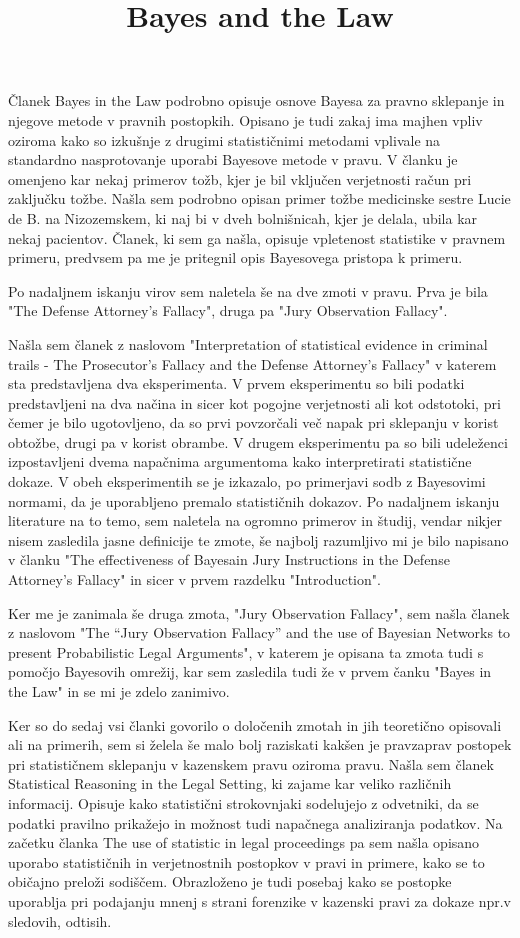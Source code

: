 \documentclass[a4paper,12pt]{article}
\begin{document}
\title{Bayes and the Law}
Članek Bayes in the Law podrobno opisuje osnove Bayesa za pravno sklepanje in njegove metode v pravnih postopkih. 
Opisano je tudi zakaj ima majhen vpliv oziroma kako so izkušnje z drugimi statističnimi metodami vplivale na standardno 
nasprotovanje uporabi Bayesove metode v pravu. V članku je omenjeno kar nekaj primerov tožb, kjer je bil vključen verjetnosti račun 
pri zaključku tožbe. Našla sem podrobno opisan primer tožbe medicinske sestre Lucie de B. na Nizozemskem, ki naj bi v dveh bolnišnicah, 
kjer je delala, ubila kar nekaj pacientov. Članek, ki sem ga našla, opisuje vpletenost statistike v pravnem primeru, predvsem pa me je pritegnil
opis Bayesovega pristopa k primeru.

Po nadaljnem iskanju virov sem naletela še na dve zmoti v pravu. Prva je bila "The Defense Attorney's Fallacy", druga pa "Jury Observation Fallacy". 

Našla sem članek z naslovom "Interpretation of statistical evidence in criminal trails - The Prosecutor's Fallacy and the Defense Attorney's Fallacy" v 
katerem sta predstavljena dva eksperimenta. V prvem eksperimentu so bili podatki predstavljeni na dva načina in sicer kot pogojne verjetnosti ali kot odstotoki, 
pri čemer je bilo ugotovljeno, da so prvi povzorčali več napak pri sklepanju v korist obtožbe, drugi pa v korist obrambe. V drugem eksperimentu pa so bili udeleženci 
izpostavljeni dvema napačnima argumentoma kako interpretirati statistične dokaze. V obeh eksperimentih se je izkazalo, po primerjavi sodb z Bayesovimi normami, da je 
uporabljeno premalo statističnih dokazov.
Po nadaljnem iskanju literature na to temo, sem naletela na ogromno primerov in študij, vendar nikjer nisem zasledila jasne definicije te zmote, še najbolj razumljivo mi je 
bilo napisano v članku "The effectiveness of Bayesain Jury Instructions in the Defense Attorney's Fallacy" in sicer v prvem razdelku "Introduction". 

Ker me je zanimala še druga zmota, "Jury Observation Fallacy", sem našla članek z naslovom "The “Jury Observation Fallacy” and the use of Bayesian Networks to present 
Probabilistic Legal Arguments", v katerem je opisana ta zmota tudi s pomočjo Bayesovih omrežij, kar sem zasledila tudi že v prvem čanku "Bayes in the Law" 
in se mi je zdelo zanimivo.

Ker so do sedaj vsi članki govorilo o določenih zmotah in jih teoretično opisovali ali na primerih, sem si želela še malo bolj raziskati kakšen je pravzaprav 
postopek pri statističnem sklepanju v kazenskem pravu oziroma pravu. Našla sem članek Statistical Reasoning in the Legal Setting, ki zajame kar veliko 
različnih informacij. Opisuje kako statistični strokovnjaki sodelujejo z odvetniki, da se podatki pravilno prikažejo in možnost tudi napačnega analiziranja podatkov.
Na začetku članka The use of statistic in legal proceedings pa sem našla opisano uporabo statističnih in verjetnostnih postopkov v pravi in primere, 
kako se to običajno preloži sodiščem. Obrazloženo je tudi posebaj kako se postopke uporablja pri podajanju mnenj s strani forenzike v kazenski pravi za 
dokaze npr.v sledovih, odtisih.
\end{document}
